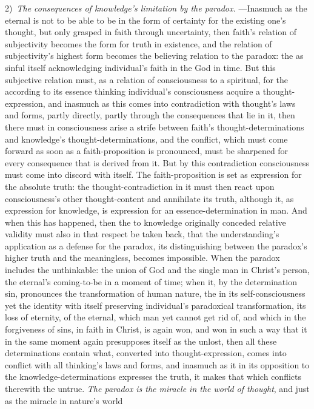 \documentclass[12pt,a4paper]{book}
\begin{document}
2)~\emph{The consequences of knowledge's limitation by the paradox.} ---Inasmuch as the eternal is not
to be able to be in the form of certainty for the existing one's thought, but only grasped in faith
through uncertainty, then faith's relation of subjectivity becomes the form for truth in existence, and
the relation of subjectivity's highest form becomes the believing relation to the paradox: the as sinful
itself acknowledging individual's faith in the God in time. But this subjective relation must, as a
relation of consciousness to a spiritual, for the according to its essence thinking individual's
consciousness acquire a thought-expression, and inasmuch as this comes into contradiction with thought's
laws and forms, partly directly, partly through the consequences that lie in it, then there must in
consciousness arise a strife between faith's thought-determinations and knowledge's thought-determinations,
and the conflict, which must come forward as soon as a faith-proposition is pronounced, must be sharpened
for every consequence that is derived from it. But by this contradiction consciousness must come into
discord with itself. The faith-proposition is set as expression for the absolute truth: the
thought-contradiction in it must then react upon consciousness's other thought-content and annihilate its
truth, although it, as expression for knowledge, is expression for an essence-determination in man. And
when this has happened, then the to knowledge originally conceded relative validity must also in that
respect be taken back, that the understanding's application as a defense for the paradox, its
distinguishing between the paradox's higher truth and the meaningless, becomes impossible. When the paradox
includes the unthinkable: the union of God and the single man in Christ's person, the eternal's
coming-to-be in a moment of time; when it, by the determination sin, pronounces the transformation of human
nature, the in its self-consciousness yet the identity with itself preserving individual's paradoxical
transformation, its loss of eternity, of the eternal, which man yet cannot get rid of, and which in the
forgiveness of sins, in faith in Christ, is again won, and won in such a way that it in the same moment
again presupposes itself as the unlost, then all these determinations contain what, converted into
thought-expression, comes into conflict with all thinking's laws and forms, and inasmuch as it in its
opposition to the knowledge-determinations expresses the truth, it makes that which conflicts therewith the
untrue.
\emph{The paradox is the miracle in the world of thought}, and just as the miracle in nature's world
\end{document}

